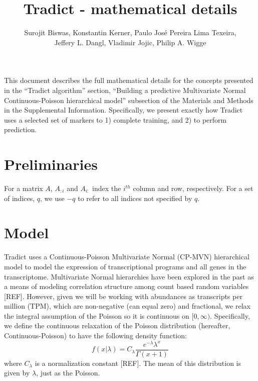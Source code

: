 \documentclass[10pt]{article}
\author{Surojit Biswas, Konstantin Kerner, Paulo Jos\'{e} Pereira Lima Texeira, \\ Jeffery L. Dangl, Vladimir Jojic, Philip A. Wigge}
\date{}
\title{Tradict - mathematical details}
\begin{document}
\maketitle

\tableofcontents
\vspace{10mm}

This document describes the full mathematical details for the concepts presented in the ``Tradict algorithm'' section, ``Building a predictive Multivariate Normal Continuous-Poisson hierarchical model''  subsection of the Materials and Methods in the Supplemental Information. Specifically, we present exactly how Tradict uses a selected set of markers to 1) complete training, and 2) to perform prediction. 

\section{Preliminaries} \label{prelim}

For a matrix $A$, $A_{:i}$ and $A_{i:}$ index the $i^{th}$ column and row, respectively. For a set of indices, $q$, we use $-q$ to refer to all indices not specified by $q$. 

\section{Model} \label{model}

Tradict uses a Continuous-Poisson Multivariate Normal (CP-MVN) hierarchical model to model the expression of transcriptional programs and all genes in the transcriptome. Multivariate Normal hierarchies have been explored in the past as a means of modeling correlation structure among count based random variables [REF]. However, given we will be working with abundances as transcripts per million (TPM), which are non-negative (can equal zero) and fractional, we  relax the integral assumption of the Poisson so it is continuous on $[0, \infty)$.   Specifically, we define the continuous relaxation of the Poisson distribution (hereafter, Continuous-Poisson) to have the following density function:
\[
f(x|\lambda) = C_\lambda \frac{e^{-\lambda} \lambda^x}{\Gamma(x + 1)}
\]
where $C_\lambda$ is a normalization constant [REF]. The mean of this distribution is given by $\lambda$, just as the Poisson.
\end{document}
